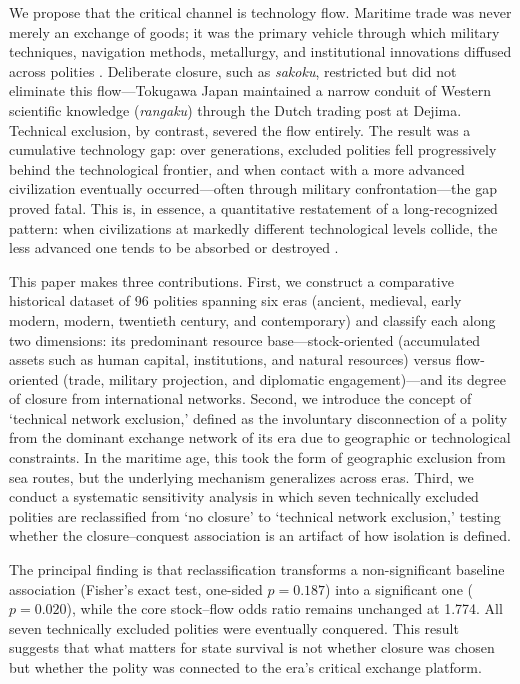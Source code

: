 \documentclass[pdflatex,sn-basic]{sn-jnl}
\theoremstyle{thmstyleone}%
\theoremstyle{thmstyletwo}%
\theoremstyle{thmstylethree}%
\begin{document}
We propose that the critical channel is technology flow. Maritime trade was never merely an exchange of goods; it was the primary vehicle through which military techniques, navigation methods, metallurgy, and institutional innovations diffused across polities \citep{Pomeranz2000, Mokyr2002}. Deliberate closure, such as \emph{sakoku}, restricted but did not eliminate this flow---Tokugawa Japan maintained a narrow conduit of Western scientific knowledge (\emph{rangaku}) through the Dutch trading post at Dejima. Technical exclusion, by contrast, severed the flow entirely. The result was a cumulative technology gap: over generations, excluded polities fell progressively behind the technological frontier, and when contact with a more advanced civilization eventually occurred---often through military confrontation---the gap proved fatal. This is, in essence, a quantitative restatement of a long-recognized pattern: when civilizations at markedly different technological levels collide, the less advanced one tends to be absorbed or destroyed \citep{Diamond1997}.

This paper makes three contributions. First, we construct a comparative historical dataset of 96 polities spanning six eras (ancient, medieval, early modern, modern, twentieth century, and contemporary) and classify each along two dimensions: its predominant resource base---stock-oriented (accumulated assets such as human capital, institutions, and natural resources) versus flow-oriented (trade, military projection, and diplomatic engagement)---and its degree of closure from international networks. Second, we introduce the concept of `technical network exclusion,' defined as the involuntary disconnection of a polity from the dominant exchange network of its era due to geographic or technological constraints. In the maritime age, this took the form of geographic exclusion from sea routes, but the underlying mechanism generalizes across eras. Third, we conduct a systematic sensitivity analysis in which seven technically excluded polities are reclassified from `no closure' to `technical network exclusion,' testing whether the closure--conquest association is an artifact of how isolation is defined.

The principal finding is that reclassification transforms a non-significant baseline association (Fisher's exact test, one-sided $p = 0.187$) into a significant one ($p = 0.020$), while the core stock--flow odds ratio remains unchanged at 1.774. All seven technically excluded polities were eventually conquered. This result suggests that what matters for state survival is not whether closure was chosen but whether the polity was connected to the era's critical exchange platform.
\end{document}
